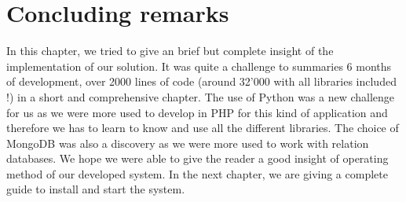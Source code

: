 \section{Concluding remarks}
In this chapter, we tried to give an brief but complete insight of the implementation of our solution. It was quite a challenge to summaries 6 months of development, over 2000 lines of code (around 32'000 with all libraries included !) in a short and comprehensive chapter. The use of Python was a new challenge for us as we were more used to develop in PHP for this kind of application and therefore we has to learn to know and use all the different libraries. The choice of MongoDB was also a discovery as we were more used to work with relation databases. We hope we were able to give the reader a good insight of operating method of our developed system. In the next chapter, we are giving a complete guide to install and start the system.
